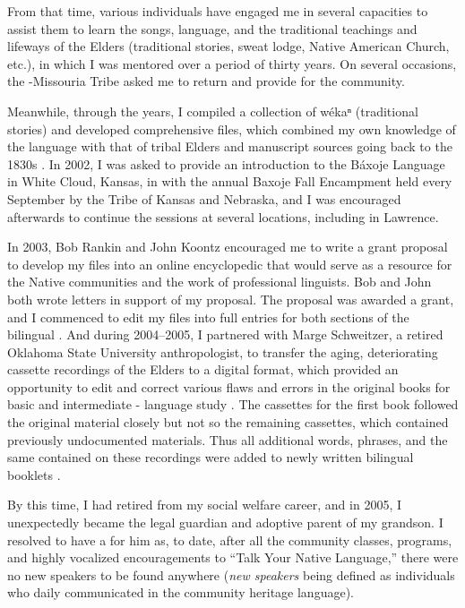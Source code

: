 \documentclass[output=paper]{LSP/langsci}
\begin{document}
From that time, various individuals have engaged me in several capacities to assist them to learn the songs, language, and the traditional teachings and lifeways of the Elders (traditional stories, sweat lodge, Native American Church, etc.), in which I was mentored over a period of thirty years. On several occasions, the -Missouria Tribe asked me to return and provide  for the community.  

Meanwhile, through the years, I compiled a collection of wékaⁿ (traditional stories) and developed comprehensive  files, which combined my own knowledge of the language with that of tribal Elders and manuscript sources going back to the 1830s \citep{Goodtracks1992}. In 2002, I was asked to provide an introduction to the Báxoje Language in White Cloud, Kansas, in  with the annual Baxoje Fall Encampment held every September by the  Tribe of Kansas and Nebraska, and I was encouraged afterwards to continue the sessions at several locations, including in Lawrence. 

In 2003, Bob Rankin and John Koontz encouraged me to write a grant proposal to develop my  files into an online encyclopedic  that would serve as a resource for the Native communities and the work of professional linguists. Bob and John both wrote letters in support of my proposal. The proposal was awarded a grant, and I commenced to edit my files into full entries for both sections of the bilingual . And during 2004--2005, I partnered with Marge Schweitzer, a retired Oklahoma State University anthropologist, to transfer the aging, deteriorating cassette recordings of the Elders to a digital format, which provided an opportunity to edit and correct various flaws and errors in the original books for basic and intermediate - language study \citep{OtoeIowaWistrandRobinson1977, OtoeIowaWistrandRobinson1978}. The cassettes for the first book followed the original material closely but not so the remaining cassettes, which contained previously undocumented materials. Thus all additional words, phrases, and the same contained on these recordings were added to newly written bilingual booklets \citep{Goodtracks2004a, Goodtracks2004b}.

By this time, I had retired from my social welfare career, and in 2005, I unexpectedly became the legal guardian and adoptive parent of my grandson. I resolved to have a  for him as, to date, after all the community classes, programs, and highly vocalized encouragements to ``Talk Your Native Language,'' there were no new speakers to be found anywhere (\emph{new speakers} being defined as individuals who daily communicated in the community heritage language).  
\end{document}
